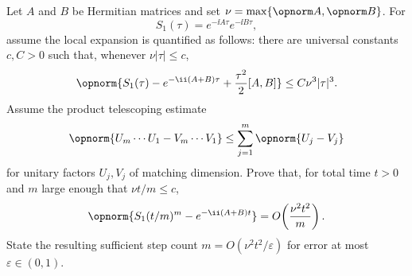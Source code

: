 Let $A$ and $B$ be Hermitian matrices and set $\nu=\max\{\opnorm A,\opnorm B\}$.  For
$$
    S_1(\tau)=e^{-\ii A\tau}e^{-\ii B\tau},
$$
assume the local expansion is quantified as follows: there are universal constants $c,C>0$ such that, whenever $\nu|\tau|\leq c$,
$$
    \opnorm{S_1(\tau)-e^{-\ii(A+B)\tau}+\frac{\tau^2}{2}[A,B]}\leq C\nu^3|\tau|^3.
$$
Assume the product telescoping estimate
$$
    \opnorm{U_m\cdots U_1-V_m\cdots V_1}
    \leq
    \sum_{j=1}^m\opnorm{U_j-V_j}
$$
for unitary factors $U_j,V_j$ of matching dimension.  Prove that, for total time $t>0$ and $m$ large enough that $\nu t/m\leq c$,
$$
    \opnorm{S_1(t/m)^m-e^{-\ii(A+B)t}}
    =O\!\left(\frac{\nu^2t^2}{m}\right).
$$
State the resulting sufficient step count $m=O(\nu^2t^2/\varepsilon)$ for error at most $\varepsilon\in(0,1)$.
